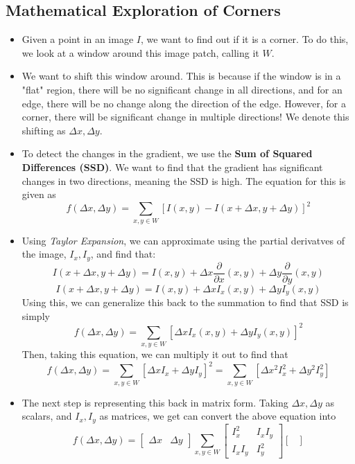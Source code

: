 \documentclass{article}
\begin{document}
\subsection{Mathematical Exploration of Corners}
\begin{itemize}
    \item Given a point in an image $I$, we want to find out if it is a corner. To do this, we look at a window around this image patch, calling it $W$. 
    \item We want to shift this window around. This is because if the window is in a "flat" region, there will be no significant change in all directions, and for an edge, there will be no change along the direction of the edge. However, for a corner, there will be significant change in multiple directions! We denote this shifting as $\Delta x, \Delta y$.
    \item To detect the changes in the gradient, we use the \textbf{Sum of Squared Differences (SSD)}. We want to find that the gradient has significant changes in two directions, meaning the SSD is high. The equation for this is given as 
    $$f(\Delta x, \Delta y) = \sum_{x,y\in W}[I(x,y) - I(x+\Delta x, y+ \Delta y)]^2$$
    \item Using \textit{Taylor Expansion}, we can approximate using the partial derivatves of the image, $I_x, I_y$, and find that:
    $$I(x+\Delta x, y + \Delta y) = I(x,y) + \Delta x\frac{\partial}{\partial x}(x,y) + \Delta y\frac{\partial}{\partial y}(x,y)$$
    $$I(x+\Delta x, y + \Delta y) = I(x,y) + \Delta xI_x(x,y) + \Delta yI_y(x,y)$$
    Using this, we can generalize this back to the summation to find that SSD is simply
    $$f(\Delta x, \Delta y) = \sum_{x,y\in W}[\Delta xI_x(x,y) + \Delta yI_y(x,y)]^2$$
    Then, taking this equation, we can multiply it out to find that
    $$f(\Delta x, \Delta y) = \sum_{x,y\in W}[\Delta xI_x + \Delta yI_y]^2 = \sum_{x,y\in W}[\Delta x^2I_x^2 + \Delta y^2I_y^2]$$
    \item The next step is representing this back in matrix form. Taking $\Delta x, \Delta y$ as scalars, and $I_x,I_y$ as matrices, we get can convert the above equation into
    $$f(\Delta x, \Delta y) =
    \begin{bmatrix}
    \Delta x & \Delta y
    \end{bmatrix}
    \sum_{x,y \in W}
    \begin{bmatrix}
    I_x^2 & I_xI_y \\
    I_xI_y & I_y^2 
    \end{bmatrix}
    \begin{bmatrix}

\end{bmatrix}$$
\end{itemize}
\end{document}
